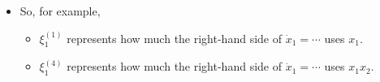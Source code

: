 \documentclass[20pt]{extarticle}
\begin{document}
\begin{itemize}
{\[\begin{aligned}
=
\begin{pmatrix} x_1(t_1) & x_2(t_1) & x_1(t_1)^2 & x_1(t_1) x_2(t_1) & x_2(t_1)^2 \\
x_1(t_2) & x_2(t_2) & x_1(t_2)^2 & x_1(t_2) x_2(t_2) & x_2(t_2)^2 \\
\vdots & \vdots & \vdots & \vdots & \vdots \\
 x_1(t_{100}) & x_2(t_{100}) & x_1(t_{100})^2 & x_1(t_{100}) x_2(t_{100}) & x_2(t_{100})^2 \end{pmatrix}
\begin{pmatrix}
\xi_1^{(1)} \\ \xi_1^{(2)} \\ \xi_1^{(3)} \\ \xi_1^{(4)} \\ \xi_1^{(5)}
\end{pmatrix}\\
%
=&
\begin{pmatrix}
x_1(t_1) \\ x_1(t_2) \\ \vdots \\ x_1(t_{100})
\end{pmatrix}
\xi_1^{(1)}
+
\begin{pmatrix}
x_2(t_1) \\ x_2(t_2) \\ \vdots \\ x_2(t_{100})
\end{pmatrix}
\xi_1^{(2)}
+
\begin{pmatrix}
x_1(t_1)^2 \\ x_1(t_2)^2 \\ \vdots \\ x_1(t_{100})^2
\end{pmatrix}
\xi_1^{(3)}\\
%
&+
\begin{pmatrix}
x_1(t_1) x_2(t_1) \\ x_1(t_2) x_2(t_2) \\ \vdots \\ x_1(t_{100}) x_2(t_{100})
\end{pmatrix}
\xi_1^{(4)}
%
+
\begin{pmatrix}
x_2(t_1)^2 \\ x_2(t_2)^2 \\ \vdots \\ x_2(t_{100})^2
\end{pmatrix}
\xi_1^{(5)}.
\end{aligned}
\]
}
%
\item So, for example,
	\begin{itemize}
	\item $\xi_1^{(1)}$ represents how much the right-hand side of $\dot{x}_1 = \cdots$ uses $x_1$.
	\item $\xi_1^{(4)}$ represents how much the right-hand side of $\dot{x}_1 = \cdots$ uses $x_1 x_2$.
	\end{itemize}
\end{itemize}
\end{document}
